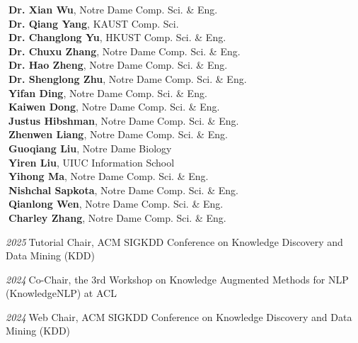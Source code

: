 \documentclass[10pt]{article}
\newenvironment{myindentpar}[1]%
{\begin{list}{}%
         {\setlength{\leftmargin}{#1}}%
         \item[]%
}
{\end{list}}
\newcounter{list}
\begin{document}
\begin{myindentpar}{0.75cm}
{\textcolor{white}{.}{\bf Dr. Xian Wu}, Notre Dame Comp. Sci. \& Eng. \\
\textcolor{white}{.}{\bf Dr. Qiang Yang}, KAUST Comp. Sci. \\
\textcolor{white}{.}{\bf Dr. Changlong Yu}, HKUST Comp. Sci. \& Eng. \\
\textcolor{white}{.}{\bf Dr. Chuxu Zhang}, Notre Dame Comp. Sci. \& Eng. \\
\textcolor{white}{.}{\bf Dr. Hao Zheng}, Notre Dame Comp. Sci. \& Eng. \\
\textcolor{white}{.}{\bf Dr. Shenglong Zhu}, Notre Dame Comp. Sci. \& Eng. \\
\textcolor{white}{.}{\bf Yifan Ding}, Notre Dame Comp. Sci. \& Eng. \\
\textcolor{white}{.}{\bf Kaiwen Dong}, Notre Dame Comp. Sci. \& Eng. \\
\textcolor{white}{.}{\bf Justus Hibshman}, Notre Dame Comp. Sci. \& Eng. \\
\textcolor{white}{.}{\bf Zhenwen Liang}, Notre Dame Comp. Sci. \& Eng. \\
\textcolor{white}{.}{\bf Guoqiang Liu}, Notre Dame Biology \\
\textcolor{white}{.}{\bf Yiren Liu}, UIUC Information School \\
\textcolor{white}{.}{\bf Yihong Ma}, Notre Dame Comp. Sci. \& Eng. \\
\textcolor{white}{.}{\bf Nishchal Sapkota}, Notre Dame Comp. Sci. \& Eng. \\
\textcolor{white}{.}{\bf Qianlong Wen}, Notre Dame Comp. Sci. \& Eng. \\
\textcolor{white}{.}{\bf Charley Zhang}, Notre Dame Comp. Sci. \& Eng.

}

\hspace{-0.75cm}{\bf Organizing Committee}

{\small

\hspace{-0.75cm}\textit{2025}\textcolor{white}{.}Tutorial Chair, ACM SIGKDD Conference on Knowledge Discovery and Data Mining (KDD)

\hspace{-0.75cm}\textit{2024}\textcolor{white}{.}Co-Chair, the 3rd Workshop on Knowledge Augmented Methods for NLP (KnowledgeNLP) at ACL

\hspace{-0.75cm}\textit{2024}\textcolor{white}{.}Web Chair, ACM SIGKDD Conference on Knowledge Discovery and Data Mining (KDD)

}
\end{myindentpar}
\end{document}
